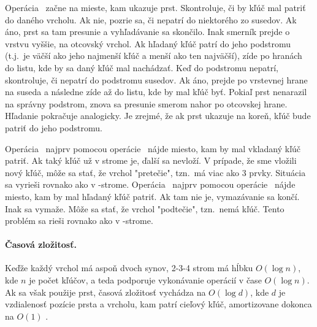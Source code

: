 Operácia \find\ začne na mieste, kam ukazuje prst. Skontroluje, či by kľúč mal patriť do daného
vrcholu. Ak nie, pozrie sa, či nepatrí do niektorého zo susedov. Ak áno, prst sa tam presunie
a vyhľadávanie sa skončilo. Inak smerník prejde o vrstvu vyššie, na otcovský vrchol. Ak hľadaný
kľúč patrí do jeho podstromu (t.j.\ je väčší ako jeho najmenší kľúč a menší ako ten najväčší),
zíde po hranách do listu, kde by sa daný kľúč mal nachádzať. Keď do podstromu nepatrí, skontroluje,
či nepatrí do podstromu susedov. Ak áno, prejde po vrstevnej hrane na suseda a následne zíde až
do listu, kde by mal kľúč byť. Pokiaľ prst nenarazil na správny podstrom, znova sa presunie smerom
nahor po otcovskej hrane. Hľadanie pokračuje analogicky. Je zrejmé, že ak prst ukazuje na koreň,
kľúč bude patriť do jeho podstromu.


Operácia \ins\ najprv pomocou operácie \find\ nájde miesto, kam by mal vkladaný kľúč patriť.
Ak taký kľúč už v strome je, ďalší sa nevloží. V prípade, že sme vložili nový kľúč, môže sa stať,
že vrchol "pretečie", tzn.\ má viac ako 3 prvky. Situácia sa vyrieši rovnako ako v \Bp-strome.
Operácia \delete\ najprv pomocou operácie \find\ nájde miesto, kam by mal hľadaný kľúč patriť.
Ak tam nie je, vymazávanie sa končí. Inak sa vymaže. Môže sa stať, že vrchol "podtečie", tzn.\ 
nemá kľúč. Tento problém sa rieši rovnako ako v \Bp-strome.

\paragraph{Časová zložitosť.}
Keďže každý vrchol má aspoň dvoch synov, 2-3-4 strom má hĺbku $O(\log n)$, kde $n$ je počet kľúčov,
a teda podporuje vykonávanie operácií v čase $O(\log n)$. Ak sa však použije prst, časová zložitosť
vychádza na $O(\log d)$, kde $d$ je vzdialenosť pozície prsta a vrcholu, kam patrí cieľový kľúč,
amortizovane dokonca na $O(1)$ \citet{sahni}.


